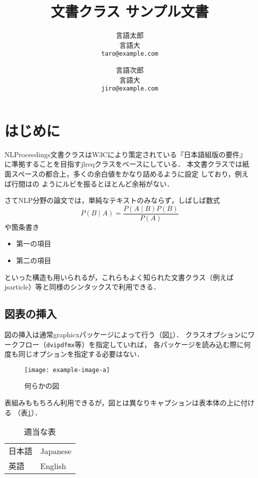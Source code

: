 \documentclass[
  platex, dvipdfmx,  %
]{nlproceedings}
\title{\pkg{NLProceedings}文書クラス サンプル文書}
\author{%
  言語太郎 \\ 言語大 \\ \texttt{taro@example.com}\and
  言語次郎 \\ 言語大 \\ \texttt{jiro@example.com}}
\newcommand{\pkg}[1]{\textsf{#1}}
\newcommand{\code}[1]{\texttt{#1}}
\begin{document}
\maketitle

\section{はじめに}

\pkg{NLProceedings}文書クラスはW3Cにより策定されている『日本語組版の要件』%
\cite{JLREQ}に準拠することを目指す\pkg{jlreq}クラスをベースにしている．
本文書クラスでは紙面スペースの都合上，多くの余白値をかなり詰めるように設定
しており，例えば行間はの
ようにルビを振るとほとんど余裕がない．

さてNLP分野の論文では，単純なテキストのみならず，しばしば数式
%
\begin{equation}
P(B\mid A) = \frac{P(A\mid B)P(B)}{P(A)}
\end{equation}
%
や箇条書き
%
\begin{itemize}
\item 第一の項目
\item 第二の項目
\end{itemize}
%
といった構造も用いられるが，これらもよく知られた文書クラス（例えば
\pkg{jsarticle}）等と同様のシンタックスで利用できる．

\subsection{図表の挿入}

図の挿入は通常\pkg{graphicx}パッケージによって行う（図\ref{fig:sample}）．
クラスオプションにワークフロー（\code{dvipdfmx}等）を指定していれば，
各パッケージを読み込む際に何度も同じオプションを指定する必要はない．
%
\begin{figure}[h]
\centering
\texttt{[image: example-image-a]}
\caption{何らかの図}
\label{fig:sample}
\end{figure}

表組みももちろん利用できるが，図とは異なりキャプションは表本体の上に付ける
（表\ref{tab:sample}）．
%
\begin{table}[h]
\centering
\caption{適当な表}
\label{tab:sample}
\begin{tabular}{ll}
\hline
日本語 & Japanese \\
英語 & English \\
\hline
\end{tabular}
\end{table}
\end{document}
